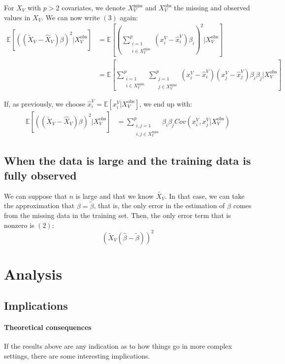 \documentclass[12pt, a4paper]{memoir}
\begin{document}
 For $X_V$ with $p>2$ covariates, we denote $X_V^{\text{miss}}$ and $X_V^{\text{obs}}$ the missing and observed values in $X_V$. We can now write $(3)$ again:
 \begin{align*}
 \mathbb{E}[((\tilde{X}_V - \hat{X}_V)\beta)^2 \vert X_V^{\text{obs}}] &= 
 		\mathbb{E}[ (\sum \limits_{\substack{i=1 \\i \in X_V^{\text{miss}}}}^{p} (x_i^V - \hat{x}_i^V)\beta_i)^2 \vert X_V^{\text{obs}}] \\
 		&= \mathbb{E}[\sum \limits_{\substack{i=1 \\i \in X_V^{\text{miss}}}}^{p} \sum \limits_{\substack{j=1 \\j \in X_V^{\text{miss}}}}^{p}
 			(x^V_i - \hat{x}^V_i)(x^V_j - \hat{x}^V_j)\beta_i \beta_j \vert X_V^{\text{obs}}]
 \end{align*}
 
 If, as previously, we choose $\hat{x}^V_i = \mathbb{E}[x^V_i \vert X_V^{\text{obs}}]$, we end up with:
 \begin{align*}
 \mathbb{E}[((\tilde{X}_V - \hat{X}_V)\beta)^2 \vert X_V^{\text{obs}}] &= 
 	\sum \limits_{\substack{i,j=1 \\i,j \in X_V^{\text{miss}}}}^{p} \beta_i \beta_j Cov(x^V_i, x^V_j \vert X_V^{\text{obs}})
 \end{align*}

		\subsection{When the data is large and the training data is fully observed}
We can suppose that $n$ is large and that we know $\tilde{X_V}$. In that case, we can take the approximation that $\beta = \tilde{\beta}$, that is, the only error in the estimation of $\beta$ comes from the missing data in the training set. Then, the only error term that is nonzero is $(2)$:
$$ (\tilde{X}_V (\hat{\beta} - \tilde{\beta}))^2$$
	\section{Analysis}
		\subsection{Implications}
\paragraph{Theoretical consequences}
If the results above are any indication as to how things go in more complex settings, there are some interesting implications. 
\end{document}
